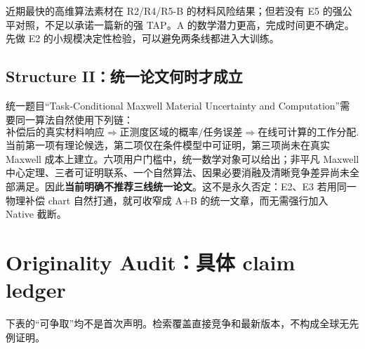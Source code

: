 近期最快的高维算法素材在 R2/R4/R5-B 的材料风险结果；但若没有 E5 的强公平对照，不足以承诺一篇新的强 TAP。A 的数学潜力更高，完成时间更不确定。先做 E2 的小规模决定性检验，可以避免两条线都进入大训练。

\subsection{Structure II：统一论文何时才成立}
统一题目“Task-Conditional Maxwell Material Uncertainty and Computation”需要同一算法自然使用下列链：
\[
\text{补偿后的真实材料响应}
\Rightarrow
\text{正测度区域的概率/任务误差}
\Rightarrow
\text{在线可计算的工作分配}.
\]
当前第一项有理论候选，第二项仅在条件模型中可证明，第三项尚未在真实 Maxwell 成本上建立。六项用户门槛中，统一数学对象可以给出；非平凡 Maxwell 中心定理、三者可证明联系、一个自然算法、因果必要消融及清晰竞争差异尚未全部满足。因此\textbf{当前明确不推荐三线统一论文}。这不是永久否定：E2、E3 若用同一物理补偿 chart 自然打通，就可收窄成 A+B 的统一文章，而无需强行加入 Native 截断。

\section{Originality Audit：具体 claim ledger}
\label{sec:originality}
下表的“可争取”均不是首次声明。检索覆盖直接竞争和最新版本，不构成全球无先例证明。

